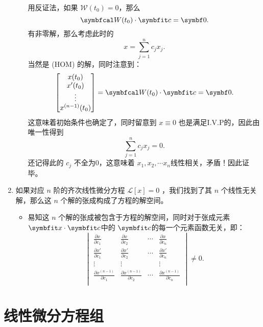 \documentclass{ctexart}
\begin{document}
\begin{enumerate}
\begin{itemize}
        用反证法，如果 \(\mathcal{W} (t_0)=0\)，那么
        \[
        \symbfcal W(t_0)\cdot \symbfit c=\symbf 0
        .\]
        有非零解，那么考虑此时的
        \[
        x=\sum\limits_{j=1}^{n} c_j x_j
        .\]
        当然是 (HOM) 的解，同时注意到：
        \[
        \begin{bmatrix}
            x(t_0) \\    x'(t_0) \\    \vdots \\    x^{(n-1)}(t_0) \\\end{bmatrix}= \symbfcal W(t_0)\cdot \symbfit c=\symbf 0
        .\]
        这意味着初始条件也确定了，同时留意到 \(x\equiv 0\) 也是满足I.V.P的，因此由唯一性得到 
\[
    \sum\limits_{j=1}^{n} c_j x_j=0
.\]
        还记得此的 \(c_j\) 不全为0，这意味着 \(x_1,x_2,\cdots x_n\)线性相关，矛盾！因此证毕。
    \end{itemize}
    \item 如果对应 \(n\) 阶的齐次线性微分方程 \(\mathcal{L} [x]=0\) ，我们找到了其 \(n\) 个线性无关解，那么这 \(n\) 个解的张成构成了方程的解空间。
    \begin{itemize}
        \item 易知这 \(n\) 个解的张成被包含于方程的解空间，同时对于张成元素 \(\symbfit x\cdot \symbfit c\)中的 \(\symbfit c\)的每一个元素函数无关，即：
        \[
        \begin{vmatrix}
            \frac{\partial x}{\partial c_1} & \frac{\partial x}{\partial c_2}& \cdots    & \frac{\partial x}{\partial c_n} \\
            \frac{\partial x'}{\partial c_1} &\frac{\partial x'}{\partial c_2} & \cdots    & \frac{\partial x'}{\partial c_n} \\
            \vdots & \vdots &  & \vdots \\
            \frac{\partial x^{(n-1)}}{\partial c_1} &\frac{\partial x^{(n-1)}}{\partial c_2} & \cdots   & \frac{\partial x^{(n-1)}}{\partial c_n} \\
        \end{vmatrix}\neq 0
        .\]
    \end{itemize}
\end{enumerate}
\section{线性微分方程组}
\end{document}
